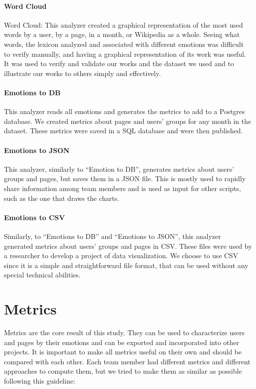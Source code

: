 \paragraph*{Word Cloud}
Word Cloud:	This analyzer created a graphical representation of the most used words by a user, by a page, in a month, or Wikipedia as a whole. Seeing what words, the lexicon analyzed and associated with different emotions was difficult to verify manually, and having a graphical representation of its work was useful. It was used to verify and validate our works and the dataset we used and to illustrate our works to others simply and effectively.

\paragraph*{Emotions to DB}
This analyzer reads all emotions and generates the metrics to add to a Postgres database. We created metrics about pages and users’ groups for any month in the dataset. These metrics were saved in a SQL database and were then published.

\paragraph*{Emotions to JSON}
This analyzer, similarly to “Emotion to DB”, generates metrics about users’ groups and pages, but saves them in a JSON file. This is mostly used to rapidly share information among team members and is used as input for other scripts, such as the one that draws the charts.

\paragraph*{Emotions to CSV}
Similarly, to “Emotions to DB” and “Emotions to JSON”, this analyzer generated metrics about users’ groups and pages in CSV. These files were used by a researcher to develop a project of data visualization. We choose to use CSV since it is a simple and straightforward file format, that can be used without any special technical abilities.


\section{Metrics}
\label{sec:metrics}
Metrics are the core result of this study. They can be used to characterize users and pages by their emotions and can be exported and incorporated into other projects. It is important to make all metrics useful on their own and should be compared with each other. Each team member had different metrics and different approaches to compute them, but we tried to make them as similar as possible following this guideline:

